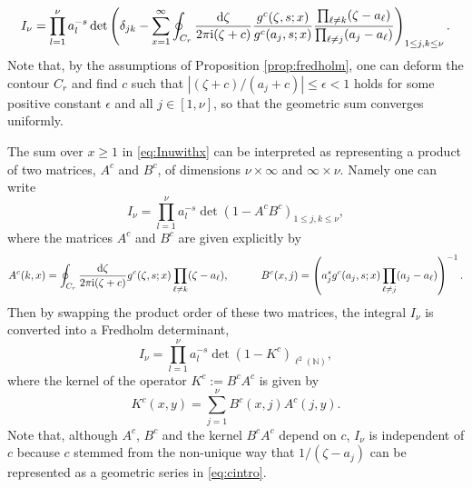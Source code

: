 \documentclass[cmp]{svjour}
\numberwithin{theorem}{section}
\numberwithin{equation}{section}
\def\dd{{\rm d}}
\def\ii{{\rm i}}
\begin{document}
\begin{align}
I_\nu
=\prod_{l=1}^{\nu}a_l^{-s}
\det\left(\delta_{jk}-
\sum_{x=1}^{\infty}
\oint_{C_r}
\frac{\dd \zeta}{2\pi\ii ( \zeta + c ) } \frac{g^c(\zeta,s ; x )}{g^c(a_j,s ; x )}
\frac{\prod_{\ell\neq k}(\zeta-a_\ell)}{\prod_{\ell\neq j} (a_j-a_\ell)}
\right)_{1\le j,k\le \nu}.
\label{eq:Inuwithx}
\end{align}
Note that, by the assumptions of Proposition \ref{prop:fredholm}, one can deform the contour $C_r$ and find $c$ such that $|(\zeta +c) /(a_j +c )|\le \epsilon<1$ holds for some positive constant $\epsilon$ and all $j \in [1, \nu]$,  so that the geometric sum converges uniformly.


The sum over $x\ge 1$ in \eqref{eq:Inuwithx} can be interpreted as representing a product of two matrices, $A^c$ and $B^c$, of dimensions $\nu\times \infty$ and $\infty\times \nu$. Namely 
one can write 
\begin{equation*}
I_\nu
=\prod_{l=1}^{\nu}a_l^{-s}
\det(1 - A^c B^c )_{1\le j,k\le \nu} ,
\end{equation*}
where the matrices $A^c$ and $B^c$ are given explicitly by
\begin{equation*}
A^c(k,x)
=
\oint_{C_r} \frac{\dd \zeta}{2\pi\ii ( \zeta +c )}
g^c(\zeta,s ; x ) \prod_{\ell\neq k} (\zeta-a_\ell) ,
\qquad\quad
B^c(x,j)
=
\left(a_j^{s}g^c(a_j, s ; x )\prod_{\ell\neq j}(a_j-a_\ell)\right)^{-1} .
\end{equation*}
Then by swapping the product order of these two matrices, the integral $I_\nu$ is converted into a Fredholm determinant,  
\begin{equation*}
I_\nu
=\prod_{l =1}^{\nu}a_l^{-s}
\det(1 - K^c )_{\ell^2(\mathbb{N})},
\end{equation*}
where the kernel of the operator $K^c:=B^c A^c$ is given by
\begin{equation}
K^c(x,y)=\sum_{j=1}^\nu B^c(x,j)A^c(j,y).
\end{equation}
Note that, although $A^c$, $B^c$ and the kernel $B^c A^c$ depend on $c$, $I_\nu$ is independent of $c$ because $c$  stemmed from the non-unique way that $1/(\zeta- a_j)$ can be represented as a geometric series in \eqref{eq:cintro}.
\end{document}
